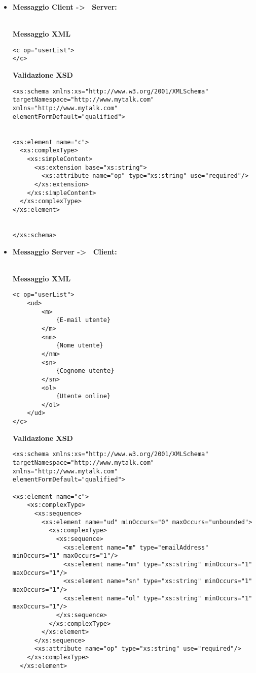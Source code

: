 {{\begin{itemize}
			\item[] \textbf{Messaggio Client -\textgreater~ Server:}{\\
			\textbf{Messaggio XML}\\
				\begin{lstlisting}
<c op="userList">
</c>
				\end{lstlisting}
				\textbf{Validazione XSD}\\
				\begin{lstlisting}
<xs:schema xmlns:xs="http://www.w3.org/2001/XMLSchema"
targetNamespace="http://www.mytalk.com"
xmlns="http://www.mytalk.com"
elementFormDefault="qualified">


<xs:element name="c">
  <xs:complexType>
    <xs:simpleContent>
      <xs:extension base="xs:string">
        <xs:attribute name="op" type="xs:string" use="required"/>
      </xs:extension>
    </xs:simpleContent>
  </xs:complexType>
</xs:element>


</xs:schema>
				\end{lstlisting}
				}
				
				\item[] \textbf{Messaggio Server -\textgreater~ Client:}{\\
				\textbf{Messaggio XML}\\
				\begin{lstlisting}
<c op="userList">
	<ud>
		<m>
			{E-mail utente}
		</m>
		<nm>
			{Nome utente}
		</nm>
		<sn>
			{Cognome utente}
		</sn>
		<ol>
			{Utente online}
		</ol>
	</ud>
</c>
				\end{lstlisting}
				\textbf{Validazione XSD}\\
				\begin{lstlisting}
<xs:schema xmlns:xs="http://www.w3.org/2001/XMLSchema"
targetNamespace="http://www.mytalk.com"
xmlns="http://www.mytalk.com"
elementFormDefault="qualified">

<xs:element name="c">
    <xs:complexType>
      <xs:sequence>
        <xs:element name="ud" minOccurs="0" maxOccurs="unbounded">
          <xs:complexType>
            <xs:sequence>
              <xs:element name="m" type="emailAddress" minOccurs="1" maxOccurs="1"/>
              <xs:element name="nm" type="xs:string" minOccurs="1" maxOccurs="1"/>
              <xs:element name="sn" type="xs:string" minOccurs="1" maxOccurs="1"/>
              <xs:element name="ol" type="xs:string" minOccurs="1" maxOccurs="1"/>
            </xs:sequence>
          </xs:complexType>
        </xs:element>
      </xs:sequence>
      <xs:attribute name="op" type="xs:string" use="required"/>
    </xs:complexType>
  </xs:element>


\end{lstlisting}}
\end{itemize}}}
